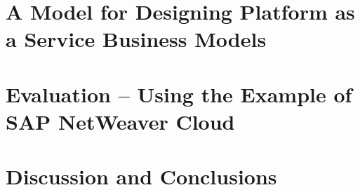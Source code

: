 \documentclass[12pt,a4paper,oneside,notitlepage,USenglish]{scrreprt}
\begin{document}







			
			\chapter{A Model for Designing Platform as a Service Business Models}\label{ch:dm}

			\chapter{Evaluation -- Using the Example of SAP NetWeaver Cloud}\label{ch:esap}

			\chapter{Discussion and Conclusions}\label{ch:dc}













\appendix
\titleformat{\chapter}{\Large}{\textbf{\appendixname~\Large\thechapter}}{15pt}{\textbf}



\end{document}
